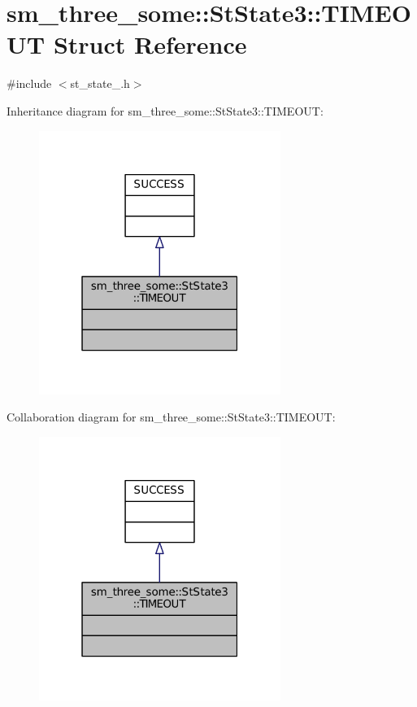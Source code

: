 \hypertarget{structsm__three__some_1_1StState3_1_1TIMEOUT}{}\section{sm\+\_\+three\+\_\+some\+:\+:St\+State3\+:\+:T\+I\+M\+E\+O\+UT Struct Reference}
\label{structsm__three__some_1_1StState3_1_1TIMEOUT}


{\ttfamily \#include $<$st\+\_\+state\+\_.\+h$>$}



Inheritance diagram for sm\+\_\+three\+\_\+some\+:\+:St\+State3\+:\+:T\+I\+M\+E\+O\+UT\+:
\nopagebreak
\begin{figure}[H]
\begin{center}
\leavevmode
\includegraphics[width=223pt]{structsm__three__some_1_1StState3_1_1TIMEOUT__inherit__graph}
\end{center}
\end{figure}


Collaboration diagram for sm\+\_\+three\+\_\+some\+:\+:St\+State3\+:\+:T\+I\+M\+E\+O\+UT\+:
\nopagebreak
\begin{figure}[H]
\begin{center}
\leavevmode
\includegraphics[width=223pt]{structsm__three__some_1_1StState3_1_1TIMEOUT__coll__graph}
\end{center}
\end{figure}



